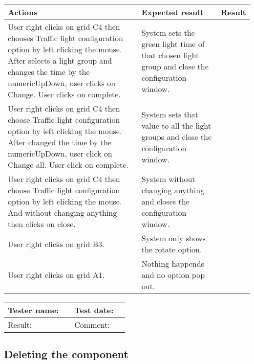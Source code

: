 \begin{enumerate}
	\begin{tabularx}{\textwidth}{|X|X|p{2.5cm}|}\hline
		Actions & Expected result & Result \\\hline
		User right clicks on grid C4 then chooses Traffic light configuration  option by left clicking the mouse. After selects a light group and changes the time by the numericUpDown, user clicks on Change. User clicks on complete. & System sets the green light time of that chosen light group and close the configuration window.  & \pass \\\hline
		User right clicks on grid C4 then choose Traffic light configuration option by left clicking the mouse. After changed the time by the numericUpDown, user click on Change all. User click on complete. & System sets that value to all the light groups and close the configuration window. & \pass \\\hline
		User right clicks on grid C4 then choose Traffic light configuration option by left clicking the mouse. And without changing anything then clicks on close. & System without changing anything and closes the configuration window. & \pass \\\hline
		User right clicks on grid B3. & System only shows the rotate option. & \pass \\\hline
		User right clicks on grid A1. & Nothing happends and no option pop out. & \pass \\\hline
	\end{tabularx}
		
\end{enumerate}

\begin{tabularx}{\textwidth}{|p{3cm}X|p{3cm}X|}\hline
	Tester name: &  & Test date: & \\\hline
	Result: &   \pass & Comment: & \\\hline
\end{tabularx}

\newpage

\subsection{Deleting the component}

